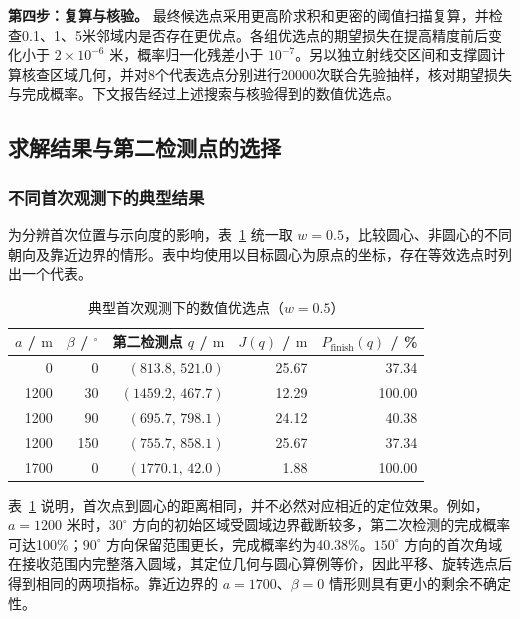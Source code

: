 \documentclass[UTF8,a4paper,zihao=-4,fontset=none]{ctexart}
\begin{document}
\textbf{第四步：复算与核验。} 最终候选点采用更高阶求积和更密的阈值扫描复算，并检查0.1、1、5米邻域内是否存在更优点。各组优选点的期望损失在提高精度前后变化小于 \(2\times10^{-6}\) 米，概率归一化残差小于 \(10^{-7}\)。另以独立射线交区间和支撑圆计算核查区域几何，并对8个代表选点分别进行20000次联合先验抽样，核对期望损失与完成概率。下文报告经过上述搜索与核验得到的数值优选点。

\subsection{求解结果与第二检测点的选择}

\subsubsection{不同首次观测下的典型结果}

为分辨首次位置与示向度的影响，表~\ref{tab:q2-typical-results} 统一取 \(w=0.5\)，比较圆心、非圆心的不同朝向及靠近边界的情形。表中均使用以目标圆心为原点的坐标，存在等效选点时列出一个代表。

\begin{table}[htbp]
  \centering
  \caption{典型首次观测下的数值优选点（\(w=0.5\)）}
  \label{tab:q2-typical-results}
  \small
  \renewcommand{\arraystretch}{1.08}
  \begin{tabular}{rrrrr}
    \toprule
    \(a\) / \(\mathrm{m}\) & \(\beta\) / \({}^\circ\) & 第二检测点 \(q\) / \(\mathrm{m}\) & \(J(q)\) / \(\mathrm{m}\) & \(P_{\mathrm{finish}}(q)\) / \% \\
    \midrule
    0 & 0 & \((813.8,\,521.0)\) & 25.67 & 37.34 \\
    1200 & 30 & \((1459.2,\,467.7)\) & 12.29 & 100.00 \\
    1200 & 90 & \((695.7,\,798.1)\) & 24.12 & 40.38 \\
    1200 & 150 & \((755.7,\,858.1)\) & 25.67 & 37.34 \\
    1700 & 0 & \((1770.1,\,42.0)\) & 1.88 & 100.00 \\
    \bottomrule
  \end{tabular}
\end{table}

表~\ref{tab:q2-typical-results} 说明，首次点到圆心的距离相同，并不必然对应相近的定位效果。例如，\(a=1200\) 米时，\(30^\circ\) 方向的初始区域受圆域边界截断较多，第二次检测的完成概率可达100\%；\(90^\circ\) 方向保留范围更长，完成概率约为40.38\%。\(150^\circ\) 方向的首次角域在接收范围内完整落入圆域，其定位几何与圆心算例等价，因此平移、旋转选点后得到相同的两项指标。靠近边界的 \(a=1700\)、\(\beta=0\) 情形则具有更小的剩余不确定性。
\end{document}
